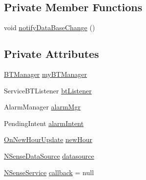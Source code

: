 \subsection*{Private Member Functions}
\begin{DoxyCompactItemize}
\item 
void \hyperlink{classcs_1_1nsense_1_1bluetooth_1_1_bluetooth_core_a8be9809070dee53edf07042fd9e8f236}{notify\-Data\-Base\-Change} ()
\end{DoxyCompactItemize}
\subsection*{Private Attributes}
\begin{DoxyCompactItemize}
\item 
\hyperlink{classcs_1_1nsense_1_1bluetooth_1_1_b_t_manager}{B\-T\-Manager} \hyperlink{classcs_1_1nsense_1_1bluetooth_1_1_bluetooth_core_a5aece68106e86a376d0710db3169fd9d}{my\-B\-T\-Manager}
\item 
Service\-B\-T\-Listener \hyperlink{classcs_1_1nsense_1_1bluetooth_1_1_bluetooth_core_a7443dfc52b72fb90380a5bc552dc972a}{bt\-Listener}
\item 
Alarm\-Manager \hyperlink{classcs_1_1nsense_1_1bluetooth_1_1_bluetooth_core_a07755d36841e588eb581696414248601}{alarm\-Mgr}
\item 
Pending\-Intent \hyperlink{classcs_1_1nsense_1_1bluetooth_1_1_bluetooth_core_a65deac543c05e4a15e85874dced0758d}{alarm\-Intent}
\item 
\hyperlink{classcs_1_1nsense_1_1bluetooth_1_1_on_new_hour_update}{On\-New\-Hour\-Update} \hyperlink{classcs_1_1nsense_1_1bluetooth_1_1_bluetooth_core_af4da0ccb246aa6a4b0615adc9cd0eef9}{new\-Hour}
\item 
\hyperlink{classcs_1_1nsense_1_1db_1_1_n_sense_data_source}{N\-Sense\-Data\-Source} \hyperlink{classcs_1_1nsense_1_1bluetooth_1_1_bluetooth_core_a0f3b59434c3490968c51311380cd9c32}{datasource}
\item 
\hyperlink{classcs_1_1nsense_1_1_n_sense_service}{N\-Sense\-Service} \hyperlink{classcs_1_1nsense_1_1bluetooth_1_1_bluetooth_core_a983df88a78355ce8e0e3ac02c3eb24e4}{callback} = null
\end{DoxyCompactItemize}


